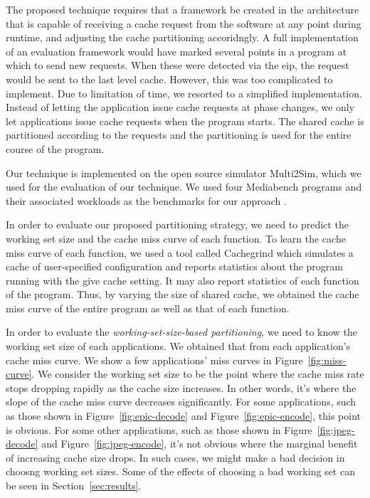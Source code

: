 \documentclass{acm_proc_article-sp}
\begin{document}
The proposed technique requires that a framework be created in the architecture that is capable of
receiving a cache request from the software at any point during runtime, 
and adjusting the cache partitioning accoridngly. A full implementation of an evaluation framework would 
have marked several points in a program at which to send new requests. When these were detected
via the eip, the request would be sent to the last level cache. However, this was too complicated to implement. Due to limitation of time, we resorted to a simplified 
implementation. Instead of letting the application issue cache requests at 
phase changes, we only let applications issue cache requests when the program
starts. The shared cache is partitioned according to the requests and the 
partitioning is used for the entire course of the program.

Our technique is implemented on the open source simulator Multi2Sim, which we used for the
evaluation of our technique. We used four Mediabench programs and their associated workloads as the benchmarks for our approach \cite{mediabench}.

In order to evaluate our proposed partitioning strategy, we need to predict the 
working set size and the cache miss curve of each function. To learn the cache 
miss curve of each function, we used a tool called Cachegrind \cite{cachegrind}
which simulates a cache of user-specified configuration and reports statistics 
about the program running with the give cache setting. It may also report 
statistics of each function of the program. Thus, by varying the size of shared 
cache, we obtained the cache miss curve of the entire program as well as that of
 each function.

In order to evaluate the \emph{working-set-size-based partitioning}, we need to 
know the working set size of each applications. We obtained that from each 
application's cache miss curve. We show a few applications' miss curves in Figure~\ref{fig:miss-curve}. 
We consider the working set size to be the point where the cache miss rate stops dropping rapidly as the cache size increases. In other words, it's where the slope of the cache miss curve decreases 
significantly. For some applications, such as those shown in 
Figure~\ref{fig:epic-decode} and Figure~\ref{fig:epic-encode}, this point is 
obvious. For some other applications, such as those shown in 
Figure~\ref{fig:jpeg-decode} and Figure~\ref{fig:jpeg-encode}, it's not obvious
where the marginal benefit of increasing cache size drops. In such cases, we 
might make a bad decision in choosng working set sizes. Some of the
effects of choosing a bad working set can be seen in Section~\ref{sec:results}.
\end{document}
